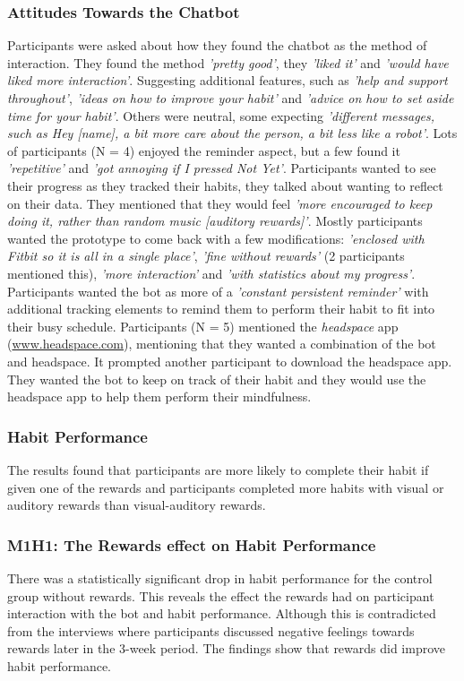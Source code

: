 \subsubsection*{Attitudes Towards the Chatbot}
Participants were asked about how they found the chatbot as the method of interaction. They found the method \textit{'pretty good'}, they \textit{'liked it'} and \textit{'would have liked more interaction'}. Suggesting additional features, such as \textit{'help and support throughout'}, \textit{'ideas on how to improve your habit'} and \textit{'advice on how to set aside time for your habit'}. Others were neutral, some expecting \textit{'different messages, such as Hey [name], a bit more care about the person, a bit less like a robot'}. Lots of participants (N = 4) enjoyed the reminder aspect, but a few found it \textit{'repetitive'} and \textit{'got annoying if I pressed Not Yet'}. Participants wanted to see their progress as they tracked their habits, they talked about wanting to reflect on their data. They mentioned that they would feel \textit{'more encouraged to keep doing it, rather than random music [auditory rewards]'}. Mostly participants wanted the prototype to come back with a few modifications: \textit{'enclosed with Fitbit so it is all in a single place'}, \textit{'fine without rewards'} (2 participants mentioned this), \textit{'more interaction'} and \textit{'with statistics about my progress'}. Participants wanted the bot as more of a \textit{'constant persistent reminder'} with additional tracking elements to remind them to perform their habit to fit into their busy schedule. Participants (N = 5) mentioned the \textit{headspace} app (\url{www.headspace.com}), mentioning that they wanted a combination of the bot and headspace. It prompted another participant to download the headspace app. They wanted the bot to keep on track of their habit and they would use the headspace app to help them perform their mindfulness.


\subsubsection{Habit Performance}
The results found that participants are more likely to complete their habit if given one of the rewards and participants completed more habits with visual or auditory rewards than visual-auditory rewards.

\subsubsection*{M1H1: The Rewards effect on Habit Performance}
There was a statistically significant drop in habit performance for the control group without rewards. This reveals the effect the rewards had on participant interaction with the bot and habit performance. Although this is contradicted from the interviews where participants discussed negative feelings towards rewards later in the 3-week period. The findings show that rewards did improve habit performance.

